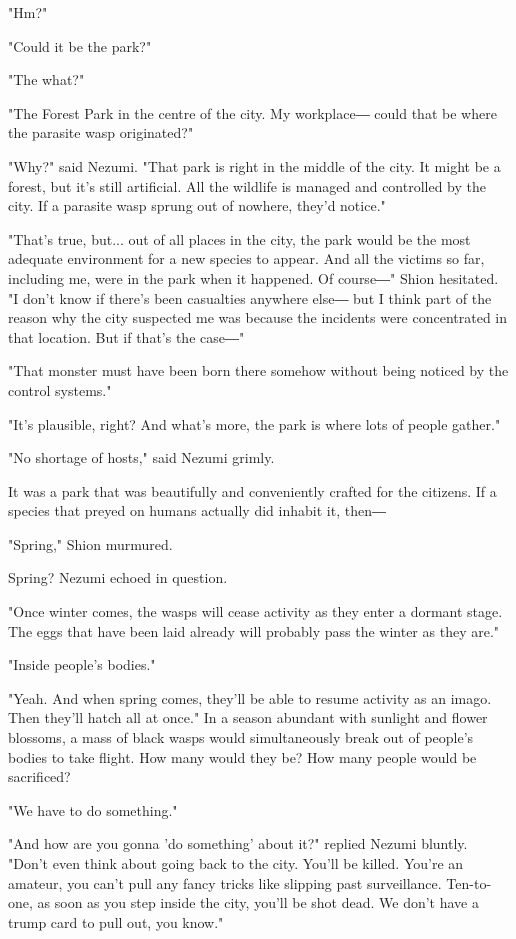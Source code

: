 "Hm?"

"Could it be the park?"

"The what?"

"The Forest Park in the centre of the city. My workplace― could that be
where the parasite wasp originated?"

"Why?" said Nezumi. "That park is right in the middle of the city. It
might be a forest, but it's still artificial. All the wildlife is
managed and controlled by the city. If a parasite wasp sprung out of
nowhere, they'd notice."

"That's true, but... out of all places in the city, the park would be
the most adequate environment for a new species to appear. And all the
victims so far, including me, were in the park when it happened. Of
course―" Shion hesitated. "I don't know if there's been casualties
anywhere else― but I think part of the reason why the city suspected me
was because the incidents were concentrated in that location. But if
that's the case―"

"That monster must have been born there somehow without being noticed by
the control systems."

"It's plausible, right? And what's more, the park is where lots of
people gather."

"No shortage of hosts," said Nezumi grimly.

It was a park that was beautifully and conveniently crafted for the
citizens. If a species that preyed on humans actually did inhabit it,
then―

"Spring," Shion murmured.

Spring? Nezumi echoed in question.

"Once winter comes, the wasps will cease activity as they enter a
dormant stage. The eggs that have been laid already will probably pass
the winter as they are."

"Inside people's bodies."

"Yeah. And when spring comes, they'll be able to resume activity as an
imago. Then they'll hatch all at once." In a season abundant with
sunlight and flower blossoms, a mass of black wasps would simultaneously
break out of people's bodies to take flight. How many would they be? How
many people would be sacrificed?

"We have to do something."

"And how are you gonna 'do something' about it?" replied Nezumi bluntly.
"Don't even think about going back to the city. You'll be killed. You're
an amateur, you can't pull any fancy tricks like slipping past
surveillance. Ten-to-one, as soon as you step inside the city, you'll be
shot dead. We don't have a trump card to pull out, you know."

